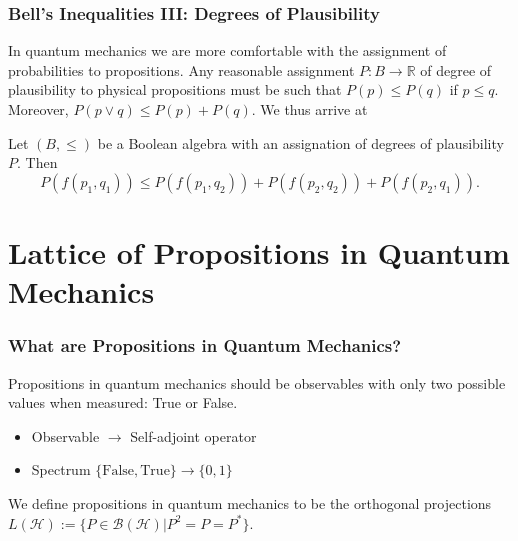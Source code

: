 \documentclass{beamer}
\begin{document}
\begin{frame}

	\frametitle{Bell's Inequalities III: Degrees of Plausibility}
	
	In quantum mechanics we are more comfortable with the assignment of probabilities to propositions\cite{Jaynes2003}. Any reasonable assignment $P:B\rightarrow \mathbb{R}$ of degree of plausibility to physical propositions must be such that $P(p)\leq P(q)$ if $p\leq q$. Moreover, $P(p\vee q)\leq P(p)+P(q)$. We thus arrive at

	\begin{theorem}
	
		Let $(B,\leq)$ be a Boolean algebra with an assignation of degrees of plausibility $P$. Then
		\begin{equation}
			P(f(p_1,q_1))\leq P(f(p_1,q_2))+P(f(p_2,q_2))+P(f(p_2,q_1)).
		\end{equation}			
	
	\end{theorem}

\end{frame}

\section{Lattice of Propositions in Quantum Mechanics}

\begin{frame}

	\frametitle{What are Propositions in Quantum Mechanics?}
	
	Propositions in quantum mechanics should be observables with only two possible values when measured: True or False\cite{Wilce2012}.
	
	\begin{itemize}
	
		\item Observable $\rightarrow$ Self-adjoint operator
		
		\item Spectrum $\{\text{False},\text{True}\}\rightarrow\{0,1\}$	
	
	\end{itemize}
	
	\begin{definition}
	
		We define propositions in quantum mechanics to be the orthogonal projections $L(\mathcal{H}):=\{P\in\mathcal{B}(\mathcal{H})|P^2=P=P^*\}$.	
	
	\end{definition}

\end{frame}
	
\end{document}
